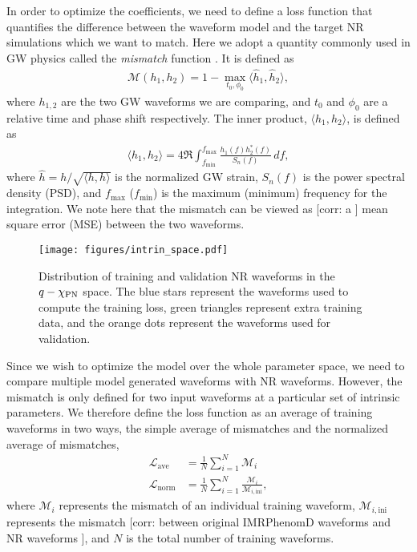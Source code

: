 \documentclass[twocolumn]{aastex631}
\newcommand{\corr}[1]{{\color{red}[corr: #1 ]}}
\begin{document}
In order to optimize the coefficients, we need to define a loss function that
quantifies the difference between the waveform model and the target NR simulations which we want to match.
Here we adopt a quantity commonly used in GW physics called the \textit{mismatch} function \citep{owen1996search, husa2016frequency}. 
It is defined as
\begin{align} \label{eq:mismatch}
	\mathcal{M}(h_1, h_2)=1-\max_{t_0, \phi_0}\langle \hat{h}_1, \hat{h}_2\rangle,
\end{align}
where $h_{1,2}$ are the two GW waveforms we are comparing, and $t_0$ and $\phi_0$
are a relative time and phase shift respectively. 
The inner product, $\langle h_1, h_2 \rangle$, is defined as 
\begin{align}\label{eq:inner_prod}
	\langle h_1, h_2 \rangle = 4\Re\int_{f_{\mathrm{min}}}^{f_{\mathrm{max}}}\frac{h_1(f)h_2^{\ast}(f)}{S_n(f)}\,df,
\end{align}
where $\hat{h}=h/\sqrt{\langle h, h \rangle}$ is the normalized GW strain,
$S_n(f)$ is the power spectral density (PSD), and $f_{\mathrm{max}}$ ($f_{\mathrm{min}}$) is
the maximum (minimum) frequency for the integration.
We note here that the mismatch can be viewed as \corr{a} mean square error (MSE) between the
two waveforms.

\begin{figure}[t]
	\centering
	\texttt{[image: figures/intrin\_space.pdf]}
	\caption{Distribution of training and validation NR waveforms in the
	$q-\chi_{\rm PN}$ space. The blue stars represent the waveforms used to compute
	the training loss, green triangles represent extra training data, and the 
	orange dots represent the waveforms used for validation.}
	\label{fig:intrin_space}
\end{figure}

Since we wish to optimize the model over the whole parameter space,
we need to compare multiple model generated waveforms with NR waveforms.
However, the mismatch is only defined for two input waveforms at a particular set of intrinsic parameters.
We therefore define the loss function as an average of training waveforms in two ways,
the simple average of mismatches and the normalized average of mismatches,  
\begin{align}\label{eqn:loss}
	\mathcal{L}_{\mathrm{ave}}&=\frac{1}{N}\sum_{i=1}^N\mathcal{M}_i \\
	\mathcal{L}_{\mathrm{norm}}&=\frac{1}{N}\sum_{i=1}^N\frac{\mathcal{M}_i}{\mathcal{M}_{i,\mathrm{ini}}},
\end{align}	
where $\mathcal{M}_i$ represents the mismatch of an individual training waveform,
$\mathcal{M}_{i,\mathrm{ini}}$ represents the mismatch \corr{between original IMRPhenomD waveforms and NR waveforms}, and $N$ is the total number of training waveforms.
\end{document}
